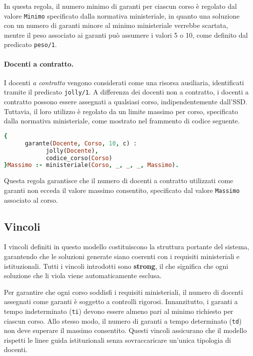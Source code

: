 In questa regola, il numero minimo di garanti per ciascun corso è regolato dal valore \texttt{Minimo} 
specificato dalla normativa ministeriale, in quanto una soluzione con un numero di garanti minore al 
minimo ministeriale verrebbe scartata, mentre il peso associato ai garanti può assumere i valori 5 o 
10, come definito dal predicato \texttt{peso/1}.

\paragraph{Docenti a contratto.}
I docenti \textit{a contratto} vengono considerati come una risorsa ausiliaria, identificati tramite 
il predicato \texttt{jolly/1}. A differenza dei docenti non a contratto, i docenti a contratto possono 
essere assegnati a qualsiasi corso, indipendentemente dall'SSD. Tuttavia, il loro utilizzo è regolato 
da un limite massimo per corso, specificato dalla normativa ministeriale, come mostrato nel frammento
di codice seguente.

\begin{lstlisting}[language=prolog, caption=Generazione dei garanti a contratto.]
{     
      garante(Docente, Corso, 10, c) :
            jolly(Docente),
            codice_corso(Corso)
}Massimo :- ministeriale(Corso, _, _, _, Massimo).
\end{lstlisting}

Questa regola garantisce che il numero di docenti a contratto utilizzati come garanti non ecceda il 
valore massimo consentito, specificato dal valore \texttt{Massimo} associato al corso.


\subsection{Vincoli}\label{sec:constraints}

I vincoli definiti in questo modello costituiscono la struttura portante del sistema, garantendo 
che le soluzioni generate siano coerenti con i requisiti ministeriali e istituzionali. 
Tutti i vincoli introdotti sono \textbf{strong}, il che significa che ogni soluzione che li 
viola viene automaticamente esclusa. 

Per garantire che ogni corso soddisfi i requisiti ministeriali, il numero di docenti assegnati 
come garanti è soggetto a controlli rigorosi. Innanzitutto, i garanti a tempo indeterminato 
(\texttt{ti}) devono essere almeno pari al minimo richiesto per ciascun corso. Allo stesso modo, 
il numero di garanti a tempo determinato (\texttt{td}) non deve superare il massimo consentito. 
Questi vincoli assicurano che il modello rispetti le linee guida istituzionali senza 
sovraccaricare un'unica tipologia di docenti.

